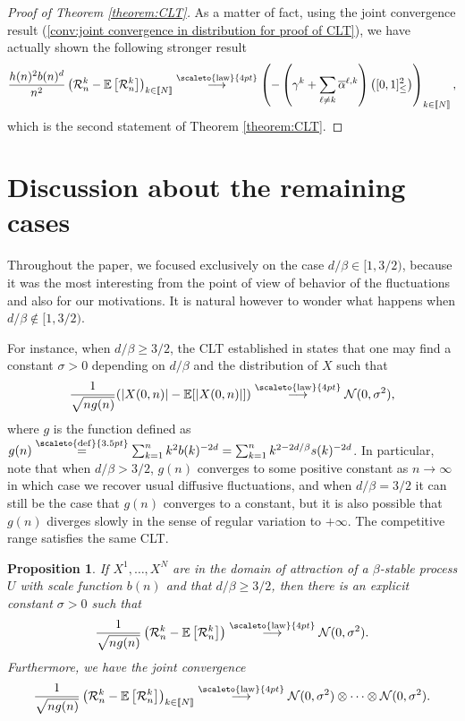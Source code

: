 \documentclass[12pt]{article}
\newcommand{\R}{\mathcal R}
\newcommand{\EE}{\mathbb E}
\newcommand{\1}{\mathds{1}}
\newcommand{\distribution}{\stackrel{\scaleto{\mathrm{law}}{4pt}}{\longrightarrow}}
\newcommand{\eqdef}{\stackrel{\scaleto{\mathrm{def}}{3.5pt}}{=}}
\newtheorem{proposition}{Proposition}
\numberwithin{equation}{section}
\begin{document}
\begin{proof}[Proof of Theorem \ref{theorem:CLT}]
    As a matter of fact, using the joint convergence result (\ref{conv:joint convergence in distribution for proof of CLT}), we have actually shown the following stronger result 
    \begin{equation*}
        \frac{h(n)^2b(n)^d}{n^2}\left(\mathcal R_n^k-\EE\left[\R_n^k\right]\right)_{k\in[\![N]\!]}\distribution\left(-\left(\gamma^k+\sum_{\ell\ne k}\overline\alpha^{\ell,k}\right)\left([0,1]_\le^2\right)\right)_{k\in[\![N]\!]},
    \end{equation*}
    which is the second statement of Theorem \ref{theorem:CLT}.
\end{proof}

\section{Discussion about the remaining cases}

Throughout the paper, we focused exclusively on the case $d/\beta\in[1,3/2)$, because it was the most interesting from the point of view of behavior of the fluctuations and also for our motivations. It is natural however to wonder what happens when $d/\beta\notin[1,3/2)$.

For instance, when $d/\beta\ge3/2$, the CLT established in \cite{LeGallRosenRangeOfStableRandomWalks1991} states that one may find a constant $\sigma>0$ depending on $d/\beta$ and the distribution of $X$ such that 
\begin{equation}
\label{limit:fluctuations range d/beta>=3/2}
    \frac{1}{\sqrt{ng(n)}}(|X(0,n)|-\EE[|X(0,n)|])\distribution\mathcal N(0,\sigma^2),
\end{equation}
where $g$ is the function defined as $g(n)\eqdef\sum_{k=1}^nk^2b(k)^{-2d}=\sum_{k=1}^nk^{2-2d/\beta}s(k)^{-2d}$. In particular, note that when $d/\beta>3/2$, $g(n)$ converges to some positive constant as $n\rightarrow\infty$ in which case we recover usual diffusive fluctuations, and when $d/\beta=3/2$ it can still be the case that $g(n)$ converges to a constant, but it is also possible that $g(n)$ diverges slowly in the sense of regular variation to $+\infty$. The competitive range satisfies the same CLT.
\begin{proposition}
    If $X^1,\dots,X^N$ are in the domain of attraction of a $\beta$-stable process $U$ with scale function $b(n)$ and that $d/\beta\ge3/2$, then there is an explicit constant $\sigma>0$ such that
    \begin{equation*}
    \frac{1}{\sqrt{ng(n)}}\left(\R_n^k-\EE\left[\R_n^k\right]\right)\distribution\mathcal N(0,\sigma^2).
    \end{equation*}
Furthermore, we have the joint convergence
\begin{equation*}
    \frac{1}{\sqrt{ng(n)}}\left(\R_n^k-\EE\left[\R_n^k\right]\right)_{k\in[\![N]\!]}\distribution\mathcal N(0,\sigma^2)\otimes\dots\otimes\mathcal N(0,\sigma^2).
    \end{equation*}
\end{proposition}
\end{document}

